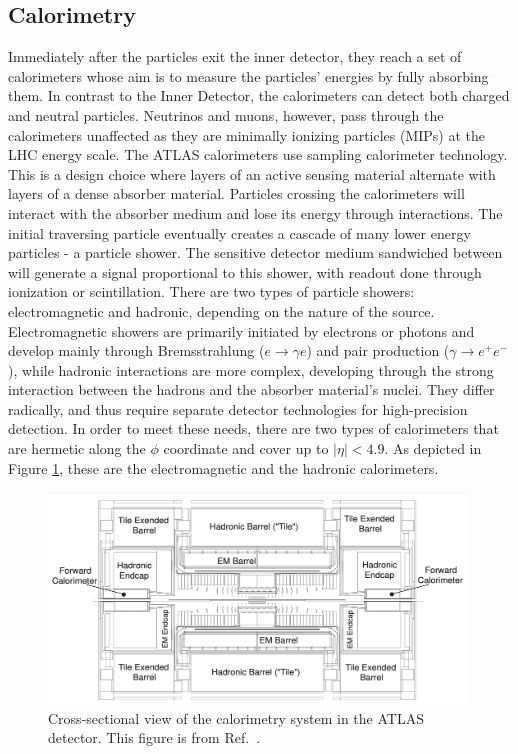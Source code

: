 \subsection{Calorimetry}
Immediately after the particles exit the inner detector, they reach a set of calorimeters whose aim is to measure the particles’ energies by fully absorbing them. In contrast to the Inner Detector, the calorimeters can detect both charged and neutral particles. Neutrinos and muons, however, pass through the calorimeters unaffected as they are minimally ionizing particles (MIPs) at the LHC energy scale. The ATLAS calorimeters use sampling calorimeter technology. This is a design choice where layers of an active sensing material alternate with layers of a dense absorber material. Particles crossing the calorimeters will interact with the absorber medium and lose its energy through interactions. The initial traversing particle eventually creates a cascade of many lower energy particles - a particle shower. The sensitive detector medium sandwiched between will generate a signal proportional to this shower, with readout done through ionization or scintillation. 
There are two types of particle showers: electromagnetic and hadronic, depending on the nature of the source. Electromagnetic showers are primarily initiated by electrons or photons and develop mainly through Bremsstrahlung ($e\rightarrow\gamma e$) and pair production ($\gamma\rightarrow e^+e^-$), while hadronic interactions are more complex, developing through the strong interaction between the hadrons and the absorber material's nuclei. They differ radically, and thus require separate detector technologies for high-precision detection.  In order to meet these needs, there are two types of calorimeters that are hermetic along the $\phi$ coordinate and cover up to $|\eta| < 4.9$. As depicted in Figure \ref{fig:calorimeters}, these are the electromagnetic and the hadronic calorimeters. 

\begin{figure}
    \centering
    \includegraphics[width=0.99\textwidth]{Figures/LHC/ATLASCalorimetry.png}
    \caption{Cross-sectional view of the calorimetry system in the ATLAS detector. This figure is from Ref.~\cite{Lampl:923625}.}
    \label{fig:calorimeters}
\end{figure}

